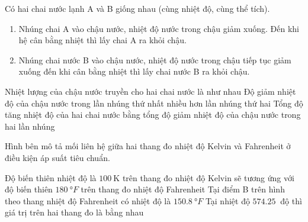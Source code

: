 \begin{ex}
Có hai chai nước lạnh A và B giống nhau (cùng nhiệt độ, cùng thể tích).
\begin{enumerate}[label=\bfseries\itshape Lần \arabic*:, leftmargin=1.5cm]
	\item Nhúng chai A vào chậu nước, nhiệt độ nước trong chậu giảm xuống. Đến khi hệ cân bằng nhiệt thì lấy chai A ra khỏi chậu.
	\item Nhúng chai nước B vào chậu nước, nhiệt độ nước trong chậu tiếp tục giảm xuống đến khi cân bằng nhiệt thì lấy chai nước B ra khỏi chậu.
\end{enumerate}
	{Nhiệt lượng của chậu nước truyền cho hai chai nước là như nhau}
	{\True Độ giảm nhiệt độ của chậu nước trong lần nhúng thứ nhất nhiều hơn lần nhúng thứ hai}
	{Tổng độ tăng nhiệt độ của hai chai nước bằng tổng độ giảm nhiệt độ của chậu nước trong hai lần nhúng}
	\loigiai{}
\end{ex}
\begin{ex}
	Hình bên mô tả mối liên hệ giữa hai thang đo nhiệt độ Kelvin và Fahrenheit ở điều kiện áp suất tiêu chuẩn.
	\begin{center}
	\end{center}
	{\True Độ biến thiên nhiệt độ là $\SI{100}{\kelvin}$ trên thang đo nhiệt độ Kelvin sẽ tương ứng với độ biến thiên $\SI{180}{\degree F}$ trên thang đo nhiệt độ Fahrenheit}
	{\True Tại điểm B trên hình theo thang nhiệt độ Fahrenheit có nhiệt độ là $\SI{150.8}{\degree F}$}
	{\True Tại nhiệt độ $\SI{574.25}{}$ độ thì giá trị trên hai thang đo là bằng nhau}
	\loigiai{}
\end{ex}
